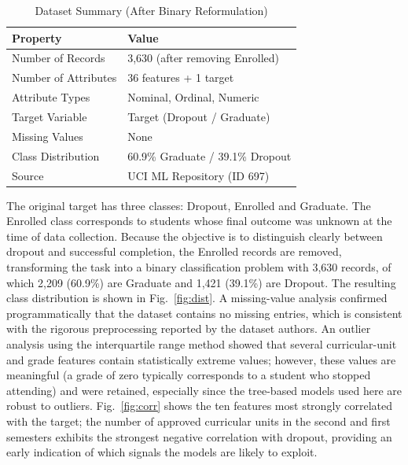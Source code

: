 \documentclass[conference]{IEEEtran}
\begin{document}
	\begin{table}[htbp]
		\caption{Dataset Summary (After Binary Reformulation)}
		\begin{center}
			\begin{tabular}{|l|l|}
				\hline
				\textbf{Property} & \textbf{Value} \\
				\hline
				Number of Records & 3,630 (after removing Enrolled) \\
				\hline
				Number of Attributes & 36 features + 1 target \\
				\hline
				Attribute Types & Nominal, Ordinal, Numeric \\
				\hline
				Target Variable & Target (Dropout / Graduate) \\
				\hline
				Missing Values & None \\
				\hline
				Class Distribution & 60.9\% Graduate / 39.1\% Dropout \\
				\hline
				Source & UCI ML Repository (ID 697) \\
				\hline
			\end{tabular}
			\label{tab:dataset}
		\end{center}
	\end{table}
	
	The original target has three classes: Dropout, Enrolled and Graduate. The Enrolled class corresponds to students whose final outcome was unknown at the time of data collection. Because the objective is to distinguish clearly between dropout and successful completion, the Enrolled records are removed, transforming the task into a binary classification problem with 3,630 records, of which 2,209 (60.9\%) are Graduate and 1,421 (39.1\%) are Dropout. The resulting class distribution is shown in Fig.~\ref{fig:dist}. A missing-value analysis confirmed programmatically that the dataset contains no missing entries, which is consistent with the rigorous preprocessing reported by the dataset authors. An outlier analysis using the interquartile range method showed that several curricular-unit and grade features contain statistically extreme values; however, these values are meaningful (a grade of zero typically corresponds to a student who stopped attending) and were retained, especially since the tree-based models used here are robust to outliers. Fig.~\ref{fig:corr} shows the ten features most strongly correlated with the target; the number of approved curricular units in the second and first semesters exhibits the strongest negative correlation with dropout, providing an early indication of which signals the models are likely to exploit.
	
\end{document}
